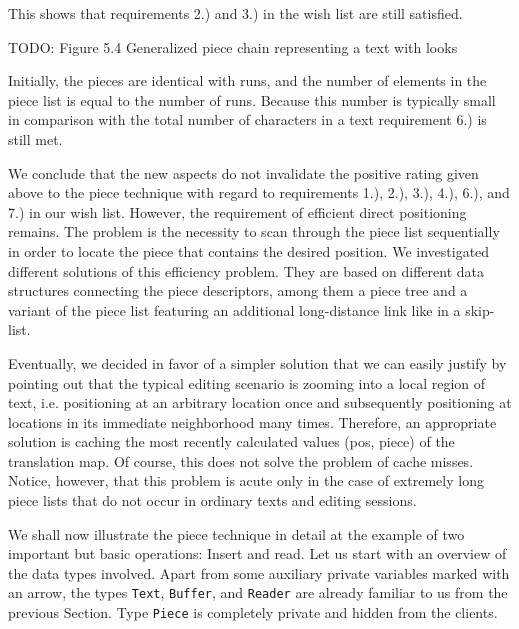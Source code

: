 \noindent This shows that requirements 2.) and 3.) in the wish list are still satisfied.

TODO: Figure 5.4 Generalized piece chain representing a text with looks

Initially, the pieces are identical with runs, and the number of elements in the piece list is equal to the number of runs. Because this number is typically small in comparison with the total number of characters in a text requirement 6.) is still met.

We conclude that the new aspects do not invalidate the positive rating given above to the piece technique with regard to requirements 1.), 2.), 3.), 4.), 6.), and 7.) in our wish list. However, the requirement of efficient direct positioning remains. The problem is the necessity to scan through the piece list sequentially in order to locate the piece that contains the desired position. We investigated different solutions of this efficiency problem. They are based on different data structures connecting the piece descriptors, among them a piece tree and a variant of the piece list featuring an additional long-distance link like in a skip-list.

Eventually, we decided in favor of a simpler solution that we can easily justify by pointing out that the typical editing scenario is zooming into a local region of text, i.e. positioning at an arbitrary location once and subsequently positioning at locations in its immediate neighborhood many times. Therefore, an appropriate solution is caching the most recently calculated values (pos, piece) of the translation map. Of course, this does not solve the problem of cache misses. Notice, however, that this problem is acute only in the case of extremely long piece lists that do not occur in ordinary texts and editing sessions.

We shall now illustrate the piece technique in detail at the example of two important but basic operations: Insert and read. Let us start with an overview of the data types involved. Apart from some auxiliary private variables marked with an arrow, the types {\tt Text\/}, {\tt Buffer\/}, and {\tt Reader\/} are already familiar to us from the previous Section. Type {\tt Piece\/} is completely private and hidden from the clients.

